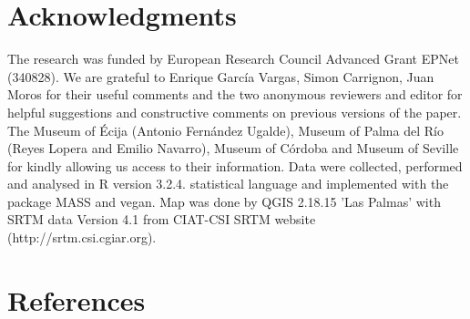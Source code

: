 \documentclass[review]{elsarticle}
\begin{document}
\section{Acknowledgments}

The research was funded by European Research Council Advanced Grant EPNet (340828). We are grateful to Enrique Garc\'ia Vargas, Simon Carrignon, Juan Moros for their useful comments and the two anonymous reviewers and editor for helpful suggestions and constructive comments on previous versions of the paper. The Museum of \'Ecija (Antonio Fern\'andez Ugalde), Museum of Palma del R\'io (Reyes Lopera and Emilio Navarro), Museum of C\'ordoba and Museum of Seville for kindly allowing us access to their information.  
Data were collected, performed and analysed in R version 3.2.4. statistical language and implemented with the package MASS and vegan. Map was done by QGIS 2.18.15 'Las Palmas' with SRTM data Version 4.1 from CIAT-CSI SRTM website (http://srtm.csi.cgiar.org)\citep{SRTM}. 


\section*{References}


\end{document}
